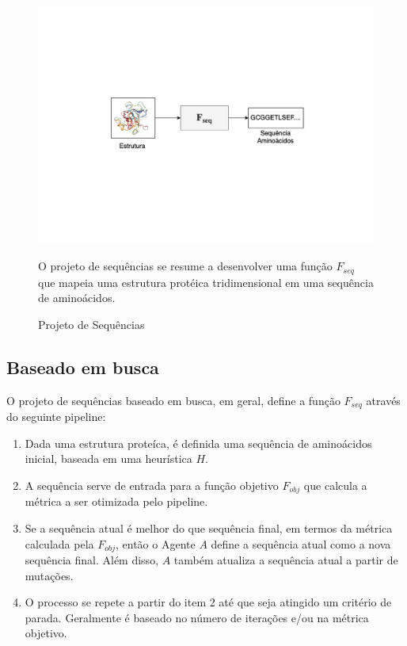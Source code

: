 \begin{figure}[H]
  \centering
  \includegraphics[width=.8\textwidth]{figuras/metodologia-SeqDes.pdf}
  \caption{Projeto de Sequências}
  O projeto de sequências se resume a desenvolver uma função $F_{seq}$ que mapeia uma estrutura protéica tridimensional em uma sequência de aminoácidos. 
\end{figure}


\subsection{Baseado em busca}
O projeto de sequências baseado em busca, em geral, define a função $F_{seq}$ através do seguinte pipeline:

\begin{enumerate}
  \item Dada uma estrutura proteíca, é definida uma sequência de aminoácidos inicial, baseada em uma  heurística $H$.
  \item A sequência serve de entrada para a função objetivo $F_{obj}$ que calcula a métrica a ser otimizada pelo pipeline.
  \item Se a sequência atual é melhor do que sequência final, em termos da métrica calculada pela $F_{obj}$, então o Agente $A$ define a sequência atual como a nova sequência final. Além disso, $A$ também atualiza a sequência atual a partir de mutações.
  \item O processo se repete a partir do item 2 até que seja atingido um critério de parada. Geralmente é baseado no número de iterações e/ou na métrica objetivo. 
\end{enumerate}

